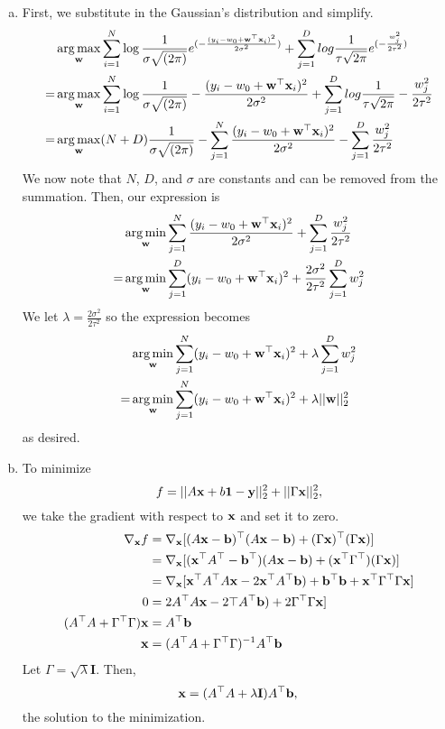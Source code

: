 \documentclass[12pt,letterpaper]{hmcpset}
\begin{document}
\begin{solution}
	\begin{enumerate}[(a)]
		\item
		First, we substitute in the Gaussian's distribution and simplify.
		\begin{align*}
			&\operatorname*{arg\,max}_{{\bf w}} \sum_{i=1}^N \log \frac{1}{\sigma \sqrt{(2 \pi)}} 
				e^{(-\frac{(y_i - w_0 + {\bf w}^\top{\bf x}_i)^2}{2\sigma^2})} 
				+ \sum_{j=1}^D log \frac{1}{\tau \sqrt{2\pi}} 
				e^{(-\frac{w_j^2}{2 \tau^2})} \\
			=&\operatorname*{arg\,max}_{{\bf w}} \sum_{i=1}^N \log \frac{1}{\sigma \sqrt{(2 \pi)}} 
			- \frac{(y_i - w_0 + {\bf w}^\top{\bf x}_i)^2}{2\sigma^2} 
			+ \sum_{j=1}^D log \frac{1}{\tau \sqrt{2\pi}} 
			- \frac{w_j^2}{2 \tau^2} \\
			=&\operatorname*{arg\,max}_{{\bf w}} (N + D) \frac{1}{\sigma \sqrt{(2 \pi)}} 
			- \sum_{j=1}^N \frac{(y_i - w_0 + {\bf w}^\top{\bf x}_i)^2}{2\sigma^2} 
			- \sum_{j=1}^D \frac{w_j^2}{2 \tau^2}
		\end{align*}
		We now note that $N$, $D$, and $\sigma$ are constants and can be removed from the summation. Then, our expression is
		\begin{align*}
			&\operatorname*{arg\,min}_{{\bf w}}
			 \sum_{j=1}^N \frac{(y_i - w_0 + {\bf w}^\top{\bf x}_i)^2}{2\sigma^2} 
			+ \sum_{j=1}^D \frac{w_j^2}{2 \tau^2}\\
			=&\operatorname*{arg\,min}_{{\bf w}}
			 \sum_{j=1}^D (y_i - w_0 + {\bf w}^\top{\bf x}_i)^2
			+ \frac{2\sigma^2}{2 \tau^2} \sum_{j=1}^D w_j^2
		\end{align*}
		We let $\lambda = \frac{2\sigma^2}{2 \tau^2}$ so the expression becomes
		\begin{align*}
			&\operatorname*{arg\,min}_{{\bf w}}
			 \sum_{j=1}^N (y_i - w_0 + {\bf w}^\top{\bf x}_i)^2
			+ \lambda \sum_{j=1}^D w_j^2 \\
			=&\operatorname*{arg\,min}_{{\bf w}}
			\sum_{j=1}^N (y_i - w_0 + {\bf w}^\top{\bf x}_i)^2
		   + \lambda ||{\bf w}||_2^2
		\end{align*}
		as desired.

		\item
		To minimize
		\[
			f = ||A{\bf x} + b{\bf 1} - {\bf y}||_2^2 + ||\Gamma{\bf x}||_2^2,
		\]
		we take the gradient with respect to ${\bf x}$ and set it to zero.
		\begin{align*}
			\nabla_{{\bf x}} f &= \nabla_{{\bf x}} [ (A{\bf x} - {\bf b})^\top (A{\bf x} - {\bf b}) 
			+(\Gamma {\bf x})^\top (\Gamma {\bf x})] \\
			&= \nabla_{{\bf x}} [ ({\bf x}^\top A^\top - {\bf b}^\top) (A{\bf x} - {\bf b}) 
			+({\bf x}^\top \Gamma^\top ) (\Gamma {\bf x}) ]\\
			&= \nabla_{{\bf x}} [ {\bf x}^\top A^\top A {\bf x} - 2{\bf x}^\top A^\top {\bf b}) 
			+ {\bf b}^\top {\bf b} + {\bf x}^\top \Gamma^\top \Gamma {\bf x} ]\\
			0 &= 2 A^\top A {\bf x} - 2\top A^\top {\bf b}) 
			+ 2 \Gamma^\top \Gamma {\bf x} ]\\
			(A^\top A + \Gamma^\top \Gamma) {\bf x} &= A^\top {\bf b} \\
			{\bf x} &= (A^\top A + \Gamma^\top \Gamma)^{-1} A^\top {\bf b} \\
		\end{align*}
		Let $\Gamma = \sqrt{\lambda} \mathbf{I}$. Then,
		\[
			{\bf x} = (A^\top A + \lambda \mathbf{I} )A^\top {\bf b}, \\
		\]
		the solution to the minimization.
	\end{enumerate}
	\vfill
\end{solution}
\newpage
\end{document}
